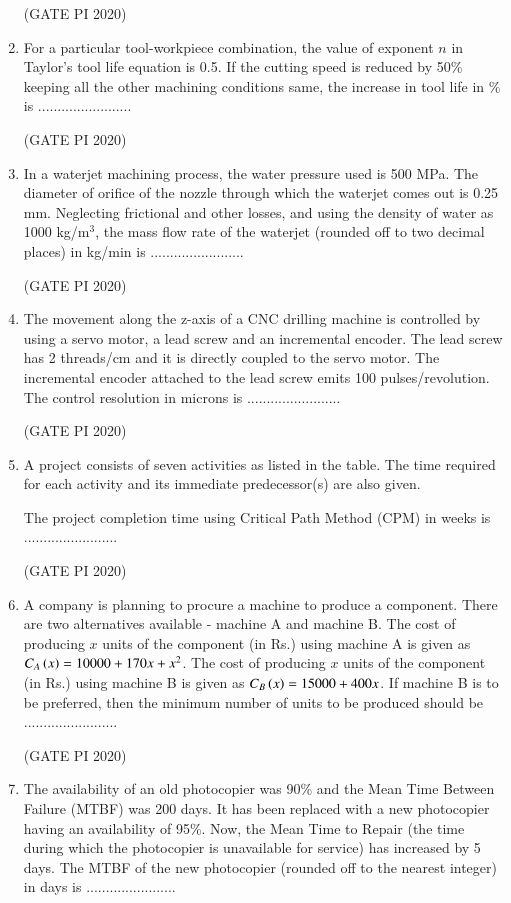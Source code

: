 \documentclass[journal,12pt,onecolumn]{IEEEtran}
\theoremstyle{remark}
\begin{document}
\begin{enumerate}
\hfill (GATE PI 2020)

\item For a particular tool\--workpiece combination, the value of exponent $n$ in Taylor's tool life equation is 0.5. If the cutting speed is reduced by 50\% keeping all the other machining conditions same, the increase in tool life in \% is ........................

\hfill (GATE PI 2020)

\item In a waterjet machining process, the water pressure used is 500 MPa. The diameter of orifice of the nozzle through which the waterjet comes out is 0.25 mm. Neglecting frictional and other losses, and using the density of water as 1000 kg/m$^3$, the mass flow rate of the waterjet (rounded off to two decimal places) in kg/min is ........................

\hfill (GATE PI 2020)

\item The movement along the z-axis of a CNC drilling machine is controlled by using a servo motor, a lead screw and an incremental encoder. The lead screw has 2 threads/cm and it is directly coupled to the servo motor. The incremental encoder attached to the lead screw emits 100 pulses/revolution. The control resolution in microns is ........................

\hfill (GATE PI 2020)

\item A project consists of seven activities as listed in the table. The time required for each activity and its immediate predecessor(s) are also given.



The project completion time using Critical Path Method (CPM) in weeks is ........................

\hfill (GATE PI 2020)
\item A company is planning to procure a machine to produce a component. There are two alternatives available - machine A and machine B. The cost of producing $x$ units of the component (in Rs.) using machine A is given as $C_A\left(x\right) = 10000 + 170x + x^2$. The cost of producing $x$ units of the component (in Rs.) using machine B is given as $C_B\left(x\right) = 15000 + 400x$. If machine B is to be preferred, then the minimum number of units to be produced should be ........................

\hfill (GATE PI 2020)

\item The availability of an old photocopier was 90\% and the Mean Time Between Failure (MTBF) was 200 days. It has been replaced with a new photocopier having an availability of 95\%. Now, the Mean Time to Repair (the time during which the photocopier is unavailable for service) has increased by 5 days. The MTBF of the new photocopier (rounded off to the nearest integer) in days is .......................


\end{enumerate}
\end{document}
